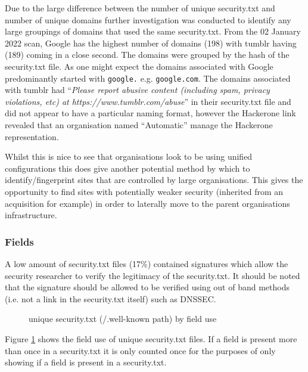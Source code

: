 \documentclass{mscreport}
\begin{document}
\vspace{0.3cm} \noindent
Due to the large difference between the number of unique security.txt and number of unique domains further investigation was conducted to identify any large groupings of domains that used the same security.txt. From the 02 January 2022 scan, Google has the highest number of domains (198) with tumblr having (189) coming in a close second. The domains were grouped by the hash of the security.txt file. As one might expect the domains associated with Google predominantly started with \texttt{google.} e.g. \texttt{google.com}. The domains associated with tumblr had ``\textit{Please report abusive content (including spam, privacy violations, etc) at https://www.tumblr.com/abuse}'' in their security.txt file and did not appear to have a particular naming format, however the Hackerone link revealed that an organisation named ``Automatic'' manage the Hackerone representation.

\vspace{0.3cm} \noindent
Whilst this is nice to see that organisations look to be using unified configurations this does give another potential method by which to identify/fingerprint sites that are controlled by large organisations. This gives the opportunity to find sites with potentially weaker security (inherited from an acquisition for example) in order to laterally move to the parent organisations infrastructure.

\newpage

\subsubsection{Fields}

\noindent
A low amount of security.txt files (17\%) contained signatures which allow the security researcher to verify the legitimacy of the security.txt. It should be noted that the signature should be allowed to be verified using out of band methods (i.e. not a link in the security.txt itself) such as DNSSEC.

\begin{figure}[t]
	\begin{center}
		\caption{unique security.txt (/.well-known path) by field use}
		\label{fig:security_txt_by_fields}
	\end{center}
\end{figure}

\vspace{0.3cm} \noindent
Figure \ref{fig:security_txt_by_fields} shows the field use of unique security.txt files. If a field is present more than once in a security.txt it is only counted once for the purposes of only showing if a field is present in a security.txt.
\end{document}
